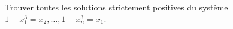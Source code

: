 Trouver toutes les solutions strictement positives du système $1 - x_1^3 = x_2, \ldots, 1 - x_n^3 = x_1$.

